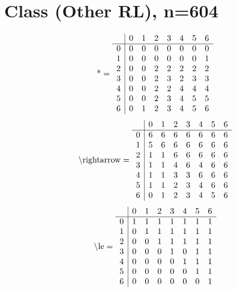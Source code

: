 \documentclass[11pt]{article}
\begin{document}
\section{Class (Other RL), n=604}
\[\text{*} = 
\begin{array}{r | r r r r r r r}
 & 0 & 1 & 2 & 3 & 4 & 5 & 6 \\ \hline
0 & 0 & 0 & 0 & 0 & 0 & 0 & 0 \\
1 & 0 & 0 & 0 & 0 & 0 & 0 & 1 \\
2 & 0 & 0 & 2 & 2 & 2 & 2 & 2 \\
3 & 0 & 0 & 2 & 3 & 2 & 3 & 3 \\
4 & 0 & 0 & 2 & 2 & 4 & 4 & 4 \\
5 & 0 & 0 & 2 & 3 & 4 & 5 & 5 \\
6 & 0 & 1 & 2 & 3 & 4 & 5 & 6 \\
\end{array}
\]
\[\text{\textbackslash rightarrow} = 
\begin{array}{r | r r r r r r r}
 & 0 & 1 & 2 & 3 & 4 & 5 & 6 \\ \hline
0 & 6 & 6 & 6 & 6 & 6 & 6 & 6 \\
1 & 5 & 6 & 6 & 6 & 6 & 6 & 6 \\
2 & 1 & 1 & 6 & 6 & 6 & 6 & 6 \\
3 & 1 & 1 & 4 & 6 & 4 & 6 & 6 \\
4 & 1 & 1 & 3 & 3 & 6 & 6 & 6 \\
5 & 1 & 1 & 2 & 3 & 4 & 6 & 6 \\
6 & 0 & 1 & 2 & 3 & 4 & 5 & 6 \\
\end{array}
\]
\[\text{\textbackslash le} = 
\begin{array}{r | r r r r r r r}
 & 0 & 1 & 2 & 3 & 4 & 5 & 6 \\ \hline
0 & 1 & 1 & 1 & 1 & 1 & 1 & 1 \\
1 & 0 & 1 & 1 & 1 & 1 & 1 & 1 \\
2 & 0 & 0 & 1 & 1 & 1 & 1 & 1 \\
3 & 0 & 0 & 0 & 1 & 0 & 1 & 1 \\
4 & 0 & 0 & 0 & 0 & 1 & 1 & 1 \\
5 & 0 & 0 & 0 & 0 & 0 & 1 & 1 \\
6 & 0 & 0 & 0 & 0 & 0 & 0 & 1 \\
\end{array}
\]
\end{document}
